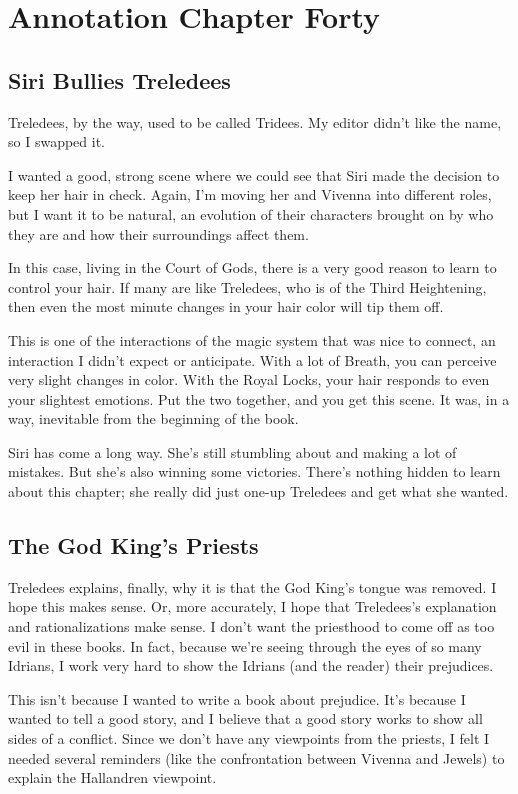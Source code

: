 \section{Annotation Chapter Forty}

\subsection*{Siri Bullies Treledees}

Treledees, by the way, used to be called Tridees. My editor didn’t like the name, so I swapped it.

I wanted a good, strong scene where we could see that Siri made the decision to keep her hair in check. Again, I’m moving her and Vivenna into different roles, but I want it to be natural, an evolution of their characters brought on by who they are and how their surroundings affect them.

In this case, living in the Court of Gods, there is a very good reason to learn to control your hair. If many are like Treledees, who is of the Third Heightening, then even the most minute changes in your hair color will tip them off.

This is one of the interactions of the magic system that was nice to connect, an interaction I didn’t expect or anticipate. With a lot of Breath, you can perceive very slight changes in color. With the Royal Locks, your hair responds to even your slightest emotions. Put the two together, and you get this scene. It was, in a way, inevitable from the beginning of the book.

Siri has come a long way. She’s still stumbling about and making a lot of mistakes. But she’s also winning some victories. There’s nothing hidden to learn about this chapter; she really did just one-up Treledees and get what she wanted.

\subsection*{The God King’s Priests}

Treledees explains, finally, why it is that the God King’s tongue was removed. I hope this makes sense. Or, more accurately, I hope that Treledees’s explanation and rationalizations make sense. I don’t want the priesthood to come off as too evil in these books. In fact, because we’re seeing through the eyes of so many Idrians, I work very hard to show the Idrians (and the reader) their prejudices.

This isn’t because I wanted to write a book about prejudice. It’s because I wanted to tell a good story, and I believe that a good story works to show all sides of a conflict. Since we don’t have any viewpoints from the priests, I felt I needed several reminders (like the confrontation between Vivenna and Jewels) to explain the Hallandren viewpoint.



